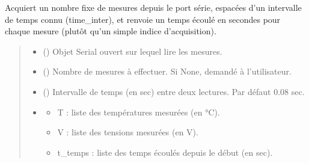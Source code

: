\documentclass[letterpaper,10pt,english]{sphinxmanual}
\begin{document}
\begin{fulllineitems}
\label{\detokenize{Mesure:Mesure.data}}
\pysigstartsignatures
\pysiglinewithargsret
{}
{\sphinxparamcomma {}}
{}
\pysigstopsignatures
\sphinxAtStartPar

Acquiert un nombre fixe de mesures depuis le port série, espacées d’un
intervalle de temps connu (time\_inter), et renvoie un temps écoulé en
secondes pour chaque mesure (plutôt qu’un simple indice d’acquisition).
\begin{quote}\begin{description}
\begin{itemize}
\item {} 
\sphinxAtStartPar
{} () \textendash{} Objet Serial ouvert sur lequel lire les mesures.

\item {} 
\sphinxAtStartPar
{} (\sphinxstyleliteralemphasis{\sphinxupquote{, }}) \textendash{} Nombre de mesures à effectuer. Si None, demandé à l’utilisateur.

\item {} 
\sphinxAtStartPar
{} (\sphinxstyleliteralemphasis{\sphinxupquote{, }}) \textendash{} Intervalle de temps (en sec) entre deux lectures. Par défaut 0.08 sec.

\item {} 
\sphinxAtStartPar
{} \textendash{} \begin{description}
\begin{itemize}
\item {} 
\sphinxAtStartPar
T : liste des températures mesurées (en °C).

\item {} 
\sphinxAtStartPar
V : liste des tensions mesurées (en V).

\item {} 
\sphinxAtStartPar
t\_temps : liste des temps écoulés depuis le début (en sec).

\end{itemize}

\end{description}


\end{itemize}

\end{description}\end{quote}

\end{fulllineitems}
\end{document}
